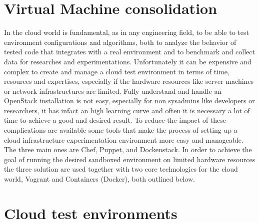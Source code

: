 \section{Virtual Machine consolidation}
\label{sec:sota_vm_cons}
In the cloud world is fundamental, as in any engineering field, to be able to test environment configurations and algorithms, both to analyze the behavior of tested code that integrates with a real environment and to benchmark and collect data for researches and experimentations. Unfortunately it can be expensive and complex to create and manage a cloud test environment in terms of time, resources and expertises, especially if the hardware resources like server machines or network infrastructures are limited. Fully understand and handle an OpenStack installation is not easy, especially for non sysadmins  like developers or researchers, it has infact an high learning curve and often it is necessary a lot of time to achieve a good and desired result.
To reduce the impact of these complications are available some tools that make the process of setting up a cloud infrastructure experimentation environment more easy and manageable.
The three main ones are Chef, Puppet, and Dockenstack. In order to achieve the goal of running the desired sandboxed environment on limited hardware resources the three solution are used together with two core technologies for the cloud world, Vagrant and Containers (Docker), both outlined below.

\section{Cloud test environments}
\label{sec:sota_test_env}

